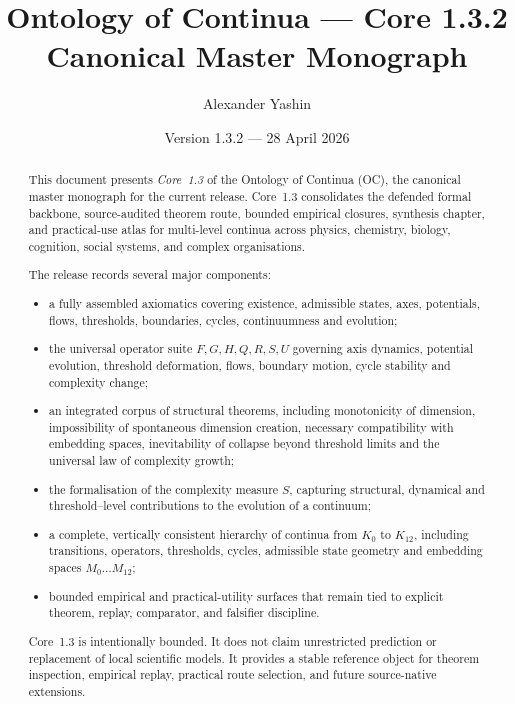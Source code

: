 
\title{Ontology of Continua --- Core 1.3.2 Canonical Master Monograph}
\author{Alexander Yashin}
\date{Version 1.3.2 --- 28 April 2026}

\maketitle

\begin{abstract}
This document presents \emph{Core~1.3} of the Ontology of Continua (OC), the
canonical master monograph for the current release. Core~1.3 consolidates the
defended formal backbone, source-audited theorem route, bounded empirical
closures, synthesis chapter, and practical-use atlas for multi-level continua
across physics, chemistry, biology, cognition, social systems, and complex
organisations.

The release records several major components:
\begin{itemize}
    \item a fully assembled axiomatics covering existence, admissible states,
          axes, potentials, flows, thresholds, boundaries, cycles, continuumness
          and evolution;
    \item the universal operator suite \(F, G, H, Q, R, S, U\) governing axis
          dynamics, potential evolution, threshold deformation, flows, boundary
          motion, cycle stability and complexity change;
    \item an integrated corpus of structural theorems, including monotonicity
          of dimension, impossibility of spontaneous dimension creation,
          necessary compatibility with embedding spaces, inevitability of
          collapse beyond threshold limits and the universal law of complexity
          growth;
    \item the formalisation of the complexity measure \(S\), capturing structural,
          dynamical and threshold--level contributions to the evolution of a
          continuum;
    \item a complete, vertically consistent hierarchy of continua from \(K_0\)
          to \(K_{12}\), including transitions, operators, thresholds, cycles,
          admissible state geometry and embedding spaces \(M_0 \dots M_{12}\);
    \item bounded empirical and practical-utility surfaces that remain tied to
          explicit theorem, replay, comparator, and falsifier discipline.
\end{itemize}

Core~1.3 is intentionally bounded. It does not claim unrestricted prediction
or replacement of local scientific models. It provides a stable reference
object for theorem inspection, empirical replay, practical route selection, and
future source-native extensions.
\end{abstract}

\tableofcontents
\clearpage
